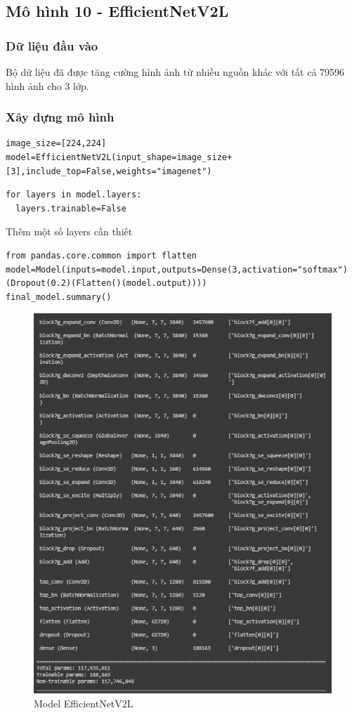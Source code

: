 \subsection{Mô hình 10 - EfficientNetV2L}
\subsubsection{Dữ liệu đầu vào}
Bộ dữ liệu đã được tăng cường hình ảnh từ nhiều nguồn khác với tất cả 79596 hình ảnh cho 3 lớp.
\subsubsection{Xây dựng mô hình}
\begin{lstlisting}
image_size=[224,224]
model=EfficientNetV2L(input_shape=image_size+[3],include_top=False,weights="imagenet")
\end{lstlisting}
\begin{lstlisting}
for layers in model.layers:
  layers.trainable=False
\end{lstlisting}
Thêm một số layers cần thiết
\begin{lstlisting}
from pandas.core.common import flatten
model=Model(inputs=model.input,outputs=Dense(3,activation="softmax")(Dropout(0.2)(Flatten()(model.output))))
final_model.summary()
\end{lstlisting}

\begin{center}
    \begin{figure}[!h]
        \centering
        \includegraphics[scale = 1.1]{fileanh/efficient3.jpg}
        \caption{Model EfficientNetV2L}
    \end{figure}
\end{center}


